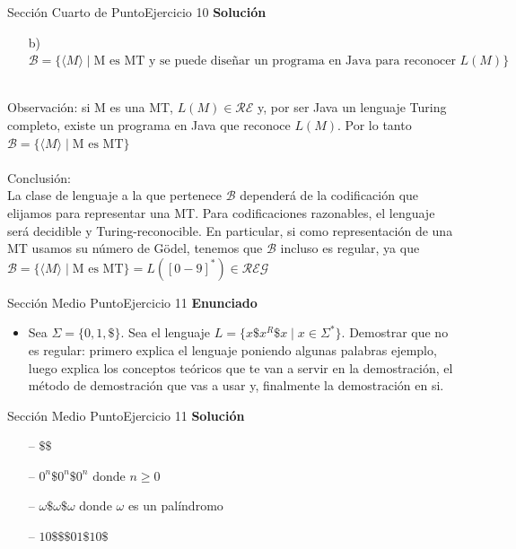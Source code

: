 \documentclass[10pt, envcountsect, presentation, aspectratio=169]{beamer}
\begin{document}

\begin{frame}{Sección Cuarto de Punto}{Ejercicio 10}
    \textbf{Solución}\\
    \begin{itemize}
        \item[b)] $\mathcal{B} = \{\langle M \rangle \mid \mbox{M es MT  y  se puede diseñar un programa en Java para reconocer } L(M)\}$\\~\\
    \end{itemize}
    Observación: si M es una MT, $L(M) \in \mathcal{RE}$ y, por ser Java un lenguaje Turing completo, existe un programa en Java que reconoce $L(M)$. Por lo tanto $\mathcal{B} = \{\langle M \rangle \mid \mbox{M es MT}\}$ \\~\\
    

    Conclusión:\\
    La clase de lenguaje a la que pertenece $\mathcal{B}$ dependerá de la codificación que elijamos para representar una MT. Para codificaciones razonables, el lenguaje será decidible y Turing-reconocible. En particular, si como representación de una MT usamos su número de Gödel, tenemos que $\mathcal{B}$ incluso es regular, ya que $\mathcal{B} = \{\langle M \rangle \mid \mbox{M es MT}\} = L([0-9]^*) \in \mathcal{REG}$
\end{frame}


\begin{frame}{Sección Medio Punto}{Ejercicio 11}
    \textbf{Enunciado}
    \begin{itemize}
        \item Sea $\Sigma=\{0,1,\$\}$. Sea el lenguaje $L=\{x\$x^R\$x \mid x \in \Sigma^*\}$. Demostrar que no es regular: primero explica el lenguaje poniendo algunas palabras ejemplo, luego explica los conceptos teóricos que te van a servir en la demostración, el método de demostración que vas a usar y, finalmente la demostración en si.
    \end{itemize}
\end{frame}


\begin{frame}{Sección Medio Punto}{Ejercicio 11}
    \textbf{Solución}\\
    \begin{itemize}
        \item[--] $\$\$$
        \item[--] $0^n \$ 0^n \$ 0^n \text{ donde } n \geq 0$
        \item[--] $ \omega \$ \omega \$ \omega \text{ donde } \omega$ es un palíndromo 
        \item[--] $10\$ \$ \$01 \$ 10\$$  
    \end{itemize}
\end{frame}
\end{document}
